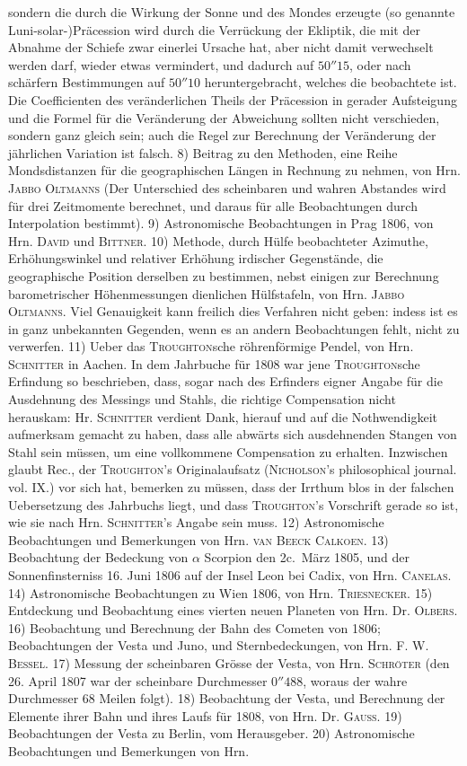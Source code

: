 sondern die durch die Wirkung der Sonne und des Mondes erzeugte (so genannte Luni-solar-)Präcession wird durch die Verrückung der Ekliptik, die mit der Abnahme der Schiefe zwar einerlei Ursache hat, aber nicht damit verwechselt werden darf, wieder etwas vermindert, und dadurch auf $50''15$, oder nach schärfern Bestimmungen auf $50''10$ heruntergebracht, welches die beobachtete ist. Die Coefficienten des veränderlichen Theils der Präcession in gerader Aufsteigung und die Formel für die Veränderung der Abweichung sollten nicht verschieden, sondern ganz gleich sein; auch die Regel zur Berechnung der Veränderung der jährlichen Variation ist falsch. 8) Beitrag zu den Methoden, eine Reihe Mondsdistanzen für die geographischen Längen in Rechnung zu nehmen, von Hrn. \textsc{Jabbo Oltmanns} (Der Unterschied des scheinbaren und wahren Abstandes wird für drei Zeitmomente berechnet, und daraus für alle Beobachtungen durch Interpolation bestimmt). 9) Astronomische Beobachtungen in Prag 1806, von Hrn. \textsc{David} und \textsc{Bittner}. 10) Methode, durch Hülfe beobachteter Azimuthe, Erhöhungswinkel und relativer Erhöhung irdischer Gegenstände, die geographische Position derselben zu bestimmen, nebst einigen zur Berechnung barometrischer Höhenmessungen dienlichen Hülfstafeln, von Hrn. \textsc{Jabbo Oltmanns}. Viel Genauigkeit kann freilich dies Verfahren nicht geben: indess ist es in ganz unbekannten Gegenden, wenn es an andern Beobachtungen fehlt, nicht zu verwerfen. 11) Ueber das \textsc{Troughton}sche röhrenförmige Pendel, von Hrn. \textsc{Schnitter} in Aachen. In dem Jahrbuche für 1808 war jene \textsc{Troughton}sche Erfindung so beschrieben, dass, sogar nach des Erfinders eigner Angabe für die Ausdehnung des Messings und Stahls, die richtige Compensation nicht herauskam: Hr. \textsc{Schnitter} verdient Dank, hierauf und auf die Nothwendigkeit aufmerksam gemacht zu haben, dass alle abwärts sich ausdehnenden Stangen von Stahl sein müssen, um eine vollkommene Compensation zu erhalten. Inzwischen glaubt Rec., der \textsc{Troughton}'s Originalaufsatz (\textsc{Nicholson}'s philosophical journal. vol. IX.) vor sich hat, bemerken zu müssen, dass der Irrthum blos in der falschen Uebersetzung des Jahrbuchs liegt, und dass \textsc{Troughton}'s Vorschrift gerade so ist, wie sie nach Hrn. \textsc{Schnitter}'s Angabe sein muss. 12) Astronomische Beobachtungen und Bemerkungen von Hrn. \textsc{van Beeck Calkoen}. 13) Beobachtung der Bedeckung von $\alpha$ Scorpion den 2c.\ März 1805, und der Sonnenfinsterniss 16. Juni 1806 auf der Insel Leon bei Cadix, von Hrn. \textsc{Canelas}. 14) Astronomische Beobachtungen zu Wien 1806, von Hrn. \textsc{Triesnecker}. 15) Entdeckung und Beobachtung eines vierten neuen Planeten von Hrn. Dr. \textsc{Olbers}. 16) Beobachtung und Berechnung der Bahn des Cometen von 1806; Beobachtungen der Vesta und Juno, und Sternbedeckungen, von Hrn. F. W. \textsc{Bessel}. 17) Messung der scheinbaren Grösse der Vesta, von Hrn. \textsc{Schröter} (den 26. April 1807 war der scheinbare Durchmesser $0''488$, woraus der wahre Durchmesser 68 Meilen folgt). 18) Beobachtung der Vesta, und Berechnung der Elemente ihrer Bahn und ihres Laufs für 1808, von Hrn. Dr. \textsc{Gauss}. 19) Beobachtungen der Vesta zu Berlin, vom Herausgeber. 20) Astronomische Beobachtungen und Bemerkungen von Hrn. 